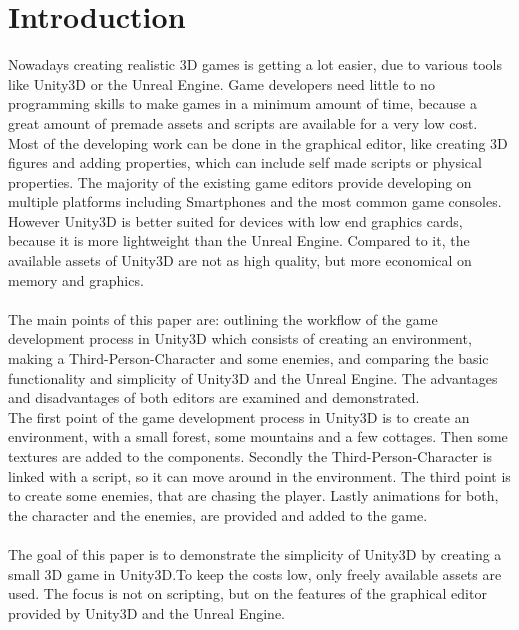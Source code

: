 \chapter{Introduction}
\label{cha:Introduction}

Nowadays creating realistic 3D games is getting a lot easier, due to various tools like Unity3D or the Unreal Engine. Game developers need little to no programming skills to make games in a minimum amount of time, because a great amount of premade assets and scripts are available for a very low cost. Most of the developing work can be done in the graphical editor, like creating 3D figures and adding properties, which can include self made scripts or physical properties. The majority of the existing game editors provide developing on multiple platforms including Smartphones and the most common game consoles. However Unity3D is better suited for devices with low end graphics cards, because it is more lightweight than the Unreal Engine. Compared to it, the available assets of Unity3D are not as high quality, but more economical on memory and graphics. \\ \\
The main points of this paper are: outlining the workflow of the game development process in Unity3D which consists of creating an environment, making a Third-Person-Character and some enemies, and comparing the basic functionality and simplicity of Unity3D and the Unreal Engine. The advantages and disadvantages of both editors are examined and demonstrated. \\
The first point of the game development process in Unity3D is to create an environment, with a small forest, some mountains and a few cottages. Then some textures are added to the components.
Secondly the Third-Person-Character is linked with a  script, so it can move around in the environment.
The third point is to create some enemies, that are chasing the player. 
Lastly animations for both, the character and the enemies, are provided and added to the game. \\ \\
The goal of this paper is to demonstrate the simplicity of Unity3D by creating a small 3D game in Unity3D.To keep the costs low, only freely available assets are used. The focus is not on scripting, but on the features of the graphical editor provided by Unity3D and the Unreal Engine. 

